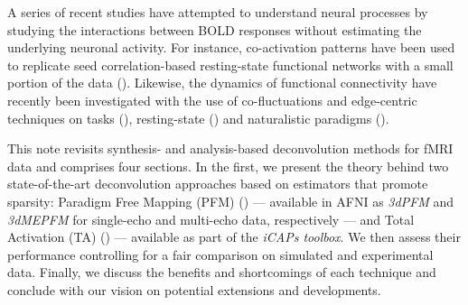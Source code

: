 A series of recent studies have attempted to understand neural processes by studying the interactions between BOLD responses without estimating the underlying neuronal activity. For instance, co-activation patterns have been used to replicate seed correlation-based resting-state functional networks with a small portion of the data (\citealt{liu2013time,liu2013decomposition,liu2018co,majeed2009spatiotemporal,majeed2011spatiotemporal,cifre2020revisiting,cifre2020further,zhang2020relationship}). Likewise, the dynamics of functional connectivity have recently been investigated with the use of co-fluctuations and edge-centric techniques on tasks (\citealt{faskowitz2021EdgecentricModelHarmonizing}), resting-state (\citealt{zamaniesfahlani2020HighamplitudeCofluctuationsCortical}) and naturalistic paradigms (\citealt{faskowitz2020EdgecentricFunctionalNetwork,betzel2020TemporalFluctuationsBrain}). %

This note revisits synthesis- and analysis-based deconvolution methods for fMRI data and comprises four sections. In the first, we present the theory behind two state-of-the-art deconvolution approaches based on estimators that promote sparsity: Paradigm Free Mapping (PFM) (\citealt{caballerogaudes2013ParadigmFreeMapping}) --- available in AFNI as \textit{3dPFM} and \textit{3dMEPFM} for single-echo and multi-echo data, respectively --- and Total Activation (TA) (\citealt{Karahanoglu2013}) --- available as part of the \textit{iCAPs toolbox}. We then assess their performance controlling for a fair comparison on simulated and experimental data. Finally, we discuss the benefits and shortcomings of each technique and conclude with our vision on potential extensions and developments.
